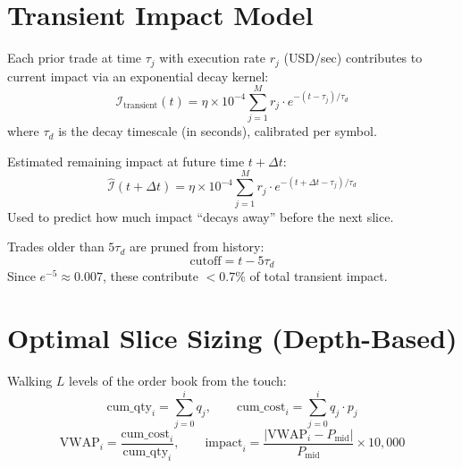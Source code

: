\documentclass[11pt,a4paper]{article}
\begin{document}
\section{Transient Impact Model}

\begin{formulabox}[title={\S4.1 — Exponential Decay Kernel}]
Each prior trade at time $\tau_j$ with execution rate $r_j$ (USD/sec) contributes to current impact via an exponential decay kernel:
\begin{equation}
  \mathcal{I}_{\text{transient}}(t) = \eta \times 10^{-4} \sum_{j=1}^{M} r_j \cdot e^{-(t - \tau_j)/\tau_d}
\end{equation}
where $\tau_d$ is the decay timescale (in seconds), calibrated per symbol.
\end{formulabox}

\begin{formulabox}[title={\S4.2 — Forward Impact Projection}]
Estimated remaining impact at future time $t + \Delta t$:
\begin{equation}
  \hat{\mathcal{I}}(t + \Delta t) = \eta \times 10^{-4} \sum_{j=1}^{M} r_j \cdot e^{-(t + \Delta t - \tau_j)/\tau_d}
\end{equation}
Used to predict how much impact ``decays away'' before the next slice.
\end{formulabox}

\begin{formulabox}[title={\S4.3 — Pruning Rule}]
Trades older than $5\tau_d$ are pruned from history:
\begin{equation}
  \text{cutoff} = t - 5\tau_d
\end{equation}
Since $e^{-5} \approx 0.007$, these contribute $<0.7\%$ of total transient impact.
\end{formulabox}


\section{Optimal Slice Sizing (Depth-Based)}

\begin{formulabox}[title={\S5.1 — Depth Walk (Cumulative VWAP)}]
Walking $L$ levels of the order book from the touch:
\begin{equation}
  \text{cum\_qty}_i = \sum_{j=0}^{i} q_j, \qquad
  \text{cum\_cost}_i = \sum_{j=0}^{i} q_j \cdot p_j
\end{equation}
\begin{equation}
  \text{VWAP}_i = \frac{\text{cum\_cost}_i}{\text{cum\_qty}_i}, \qquad
  \text{impact}_i = \frac{|\text{VWAP}_i - P_{\text{mid}}|}{P_{\text{mid}}} \times 10{,}000
\end{equation}
\end{formulabox}
\end{document}
